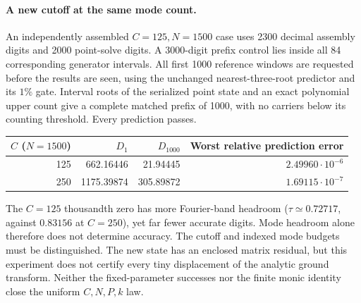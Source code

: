 \paragraph{A new cutoff at the same mode count.}
An independently assembled $C=125,N=1500$ case uses 2300 decimal
assembly digits and 2000 point-solve digits. A 3000-digit prefix control
lies inside all 84 corresponding generator intervals. All first 1000
reference windows are requested before the results are seen, using
the unchanged nearest-three-root predictor and its $1\%$ gate.
Interval roots of the serialized point state and an exact polynomial
upper count give a complete matched prefix of 1000, with no carriers
below its counting threshold. Every prediction passes.
\begin{center}\small
\begin{tabular}{r|rrr}
$C$ ($N=1500$)&$D_1$&$D_{1000}$&Worst relative prediction error\\
\hline
125&662.16446&21.94445&$2.49960\cdot10^{-6}$\\
250&1175.39874&305.89872&$1.69115\cdot10^{-7}$
\end{tabular}
\end{center}
The $C=125$ thousandth zero has more Fourier-band headroom
($\tau\simeq0.72717$, against $0.83156$ at $C=250$), yet far fewer
accurate digits. Mode headroom alone therefore does not determine
accuracy. The cutoff and indexed mode budgets must be distinguished.
The new state has an enclosed matrix residual, but this experiment
does not certify every tiny displacement of the analytic ground
transform. Neither the fixed-parameter successes nor the finite monic
identity close the uniform $C,N,P,k$ law.
